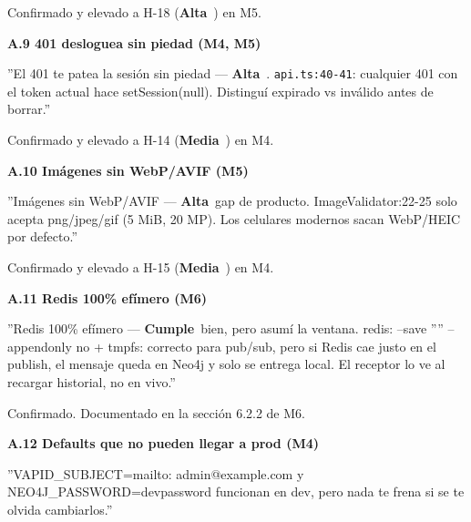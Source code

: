 \documentclass[10pt,a4paper]{article}
\newcommand{\code}[1]{\nolinkurl{#1}}
\newcommand{\badgeAlta}{\colorbox{orange!20}{\textcolor{orange!90!black}{\textbf{\footnotesize Alta}}}}
\newcommand{\badgeMedia}{\colorbox{yellow!35}{\textcolor{brown!90!black}{\textbf{\footnotesize Media}}}}
\newcommand{\badgeCumple}{\colorbox{green!20}{\textcolor{green!60!black}{\textbf{\footnotesize Cumple}}}}
\begin{document}
Confirmado y elevado a H-18 (\badgeAlta\ ) en M5.\par\vspace{0.4em}
\vspace{0.6em}\noindent\textbf{\normalsize A.9 401 desloguea sin piedad (M4, M5)}\par\vspace{0.2em}
''El 401 te patea la sesión sin piedad --- \badgeAlta\ . \code{api.ts:40-41}: cualquier 401 con el token actual hace setSession(null). Distinguí expirado vs inválido antes de borrar.''\par\vspace{0.4em}
Confirmado y elevado a H-14 (\badgeMedia\ ) en M4.\par\vspace{0.4em}
\vspace{0.6em}\noindent\textbf{\normalsize A.10 Imágenes sin WebP/AVIF (M5)}\par\vspace{0.2em}
''Imágenes sin WebP/AVIF --- \badgeAlta\  gap de producto. ImageValidator:22-25 solo acepta png/jpeg/gif (5 MiB, 20 MP). Los celulares modernos sacan WebP/HEIC por defecto.''\par\vspace{0.4em}
Confirmado y elevado a H-15 (\badgeMedia\ ) en M4.\par\vspace{0.4em}
\vspace{0.6em}\noindent\textbf{\normalsize A.11 Redis 100\% efímero (M6)}\par\vspace{0.2em}
''Redis 100\% efímero --- \badgeCumple\  bien, pero asumí la ventana. redis: --save '''' --appendonly no + tmpfs: correcto para pub/sub, pero si Redis cae justo en el publish, el mensaje queda en Neo4j y solo se entrega local. El receptor lo ve al recargar historial, no en vivo.''\par\vspace{0.4em}
Confirmado. Documentado en la sección 6.2.2 de M6.\par\vspace{0.4em}
\vspace{0.6em}\noindent\textbf{\normalsize A.12 Defaults que no pueden llegar a prod (M4)}\par\vspace{0.2em}
''VAPID\_SUBJECT=mailto: admin@example.com y NEO4J\_PASSWORD=devpassword funcionan en dev, pero nada te frena si se te olvida cambiarlos.''\par\vspace{0.4em}
\end{document}
